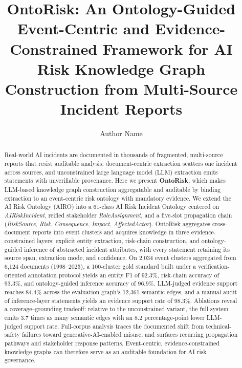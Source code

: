 \documentclass[a4paper,fleqn]{cas-dc}
\begin{document}

\title[mode=title]{OntoRisk: An Ontology-Guided Event-Centric and Evidence-Constrained Framework for AI Risk Knowledge Graph Construction from Multi-Source Incident Reports}

\author{Author Name}
\cormark[1]

\address{Affiliation}


\begin{abstract}
Real-world AI incidents are documented in thousands of fragmented,
multi-source reports that resist auditable analysis:
document-centric extraction scatters one incident across
sources, and unconstrained large language model (LLM) extraction emits statements with
unverifiable provenance. Here we present \textbf{OntoRisk}, which
makes LLM-based knowledge graph construction
aggregatable and auditable by binding extraction to an event-centric
risk ontology with mandatory evidence. We extend the AI Risk Ontology
(AIRO) into a 61-class AI Risk Incident Ontology centered on
\textit{AIRiskIncident}, reified stakeholder \textit{RoleAssignment},
and a five-slot propagation chain (\textit{RiskSource},
\textit{Risk}, \textit{Consequence}, \textit{Impact},
\textit{AffectedActor}). OntoRisk aggregates cross-document reports
into event clusters and acquires knowledge in three
evidence-constrained layers: explicit entity extraction, risk-chain
construction, and ontology-guided inference of abstracted
incident attributes, with every statement
retaining its source span, extraction mode, and confidence. On
2{,}034 event clusters aggregated from 6{,}124 documents
(1998--2025), a 100-cluster gold standard built under a
verification-oriented annotation protocol yields
an entity F1 of 92.3\%, risk-chain accuracy of 93.3\%, and
ontology-guided inference accuracy of 96.9\%. LLM-judged evidence support
reaches 84.4\% across the evaluation graph's 12{,}361 semantic
edges, and a manual audit of inference-layer statements yields an
evidence support rate of 98.3\%. Ablations
reveal a coverage--grounding
tradeoff: relative to the unconstrained variant, the full system
emits 3.7 times as many semantic edges with an 8.2 percentage-point
lower LLM-judged support rate. Full-corpus
analysis traces the documented shift from technical-safety
failures toward generative-AI-enabled misuse, and surfaces recurring
propagation pathways and stakeholder response patterns.
Event-centric, evidence-constrained knowledge graphs can therefore
serve as an auditable foundation for AI risk governance.
\end{abstract}
\end{document}

